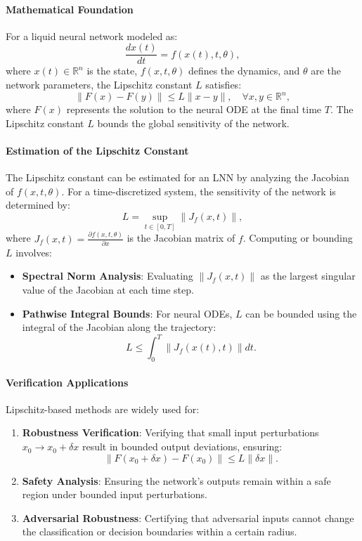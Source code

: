 \paragraph{Mathematical Foundation}
For a liquid neural network modeled as:
\[
\frac{dx(t)}{dt} = f(x(t), t, \theta),
\]
where \(x(t) \in \mathbb{R}^n\) is the state, \(f(x, t, \theta)\) defines the dynamics, and \(\theta\) are the network parameters, the Lipschitz constant \(L\) satisfies:
\[
\|F(x) - F(y)\| \leq L \|x - y\|, \quad \forall x, y \in \mathbb{R}^n,
\]
where \(F(x)\) represents the solution to the neural ODE at the final time \(T\). The Lipschitz constant \(L\) bounds the global sensitivity of the network.

\paragraph{Estimation of the Lipschitz Constant}
The Lipschitz constant can be estimated for an LNN by analyzing the Jacobian of \(f(x, t, \theta)\). For a time-discretized system, the sensitivity of the network is determined by:
\[
L = \sup_{t \in [0, T]} \| J_f(x, t) \|,
\]
where \(J_f(x, t) = \frac{\partial f(x, t, \theta)}{\partial x}\) is the Jacobian matrix of \(f\). Computing or bounding \(L\) involves:
\begin{itemize}
    \item \textbf{Spectral Norm Analysis}: Evaluating \(\|J_f(x, t)\|\) as the largest singular value of the Jacobian at each time step.
    \item \textbf{Pathwise Integral Bounds}: For neural ODEs, \(L\) can be bounded using the integral of the Jacobian along the trajectory:
    \[
    L \leq \int_0^T \|J_f(x(t), t)\| dt.
    \]
\end{itemize}

\paragraph{Verification Applications}
Lipschitz-based methods are widely used for:
\begin{enumerate}
    \item \textbf{Robustness Verification}: Verifying that small input perturbations \(x_0 \to x_0 + \delta x\) result in bounded output deviations, ensuring:
    \[
    \|F(x_0 + \delta x) - F(x_0)\| \leq L \|\delta x\|.
    \]
    \item \textbf{Safety Analysis}: Ensuring the network’s outputs remain within a safe region under bounded input perturbations.
    \item \textbf{Adversarial Robustness}: Certifying that adversarial inputs cannot change the classification or decision boundaries within a certain radius.
\end{enumerate}

